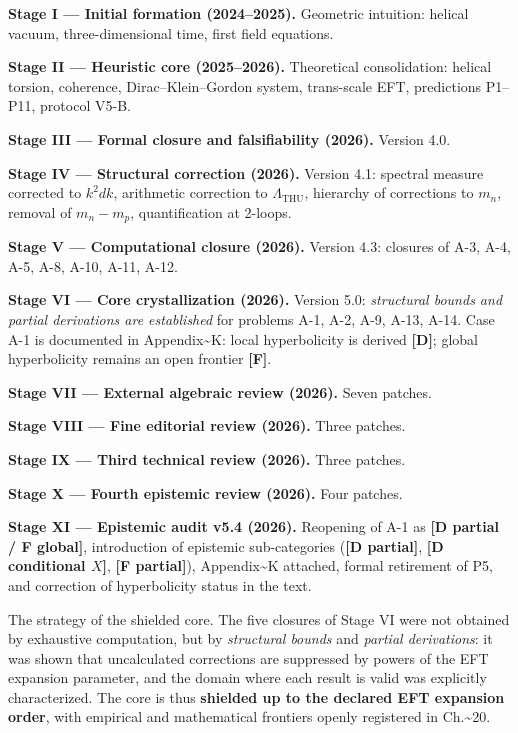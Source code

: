 ﻿\documentclass[11pt,letterpaper]{article}
\begin{document}
\textbf{Stage I --- Initial formation (2024--2025).} Geometric intuition: helical vacuum, three-dimensional time, first field equations.

\textbf{Stage II --- Heuristic core (2025--2026).} Theoretical consolidation: helical torsion, coherence, Dirac--Klein--Gordon system, trans-scale EFT, predictions P1--P11, protocol V5-B.

\textbf{Stage III --- Formal closure and falsifiability (2026).} Version 4.0.

\textbf{Stage IV --- Structural correction (2026).} Version 4.1: spectral measure corrected to $k^2 dk$, arithmetic correction to $\Lambda_{\mathrm{THU}}$, hierarchy of corrections to $m_n$, removal of $m_n - m_p$, quantification at 2-loops.

\textbf{Stage V --- Computational closure (2026).} Version 4.3: closures of A-3, A-4, A-5, A-8, A-10, A-11, A-12.

\textbf{Stage VI --- Core crystallization (2026).} Version 5.0: \emph{structural bounds and partial derivations are established} for problems A-1, A-2, A-9, A-13, A-14. Case A-1 is documented in Appendix\textasciitilde{}K: local hyperbolicity is derived \textbf{[D]}; global hyperbolicity remains an open frontier \textbf{[F]}.

\textbf{Stage VII --- External algebraic review (2026).} Seven patches.

\textbf{Stage VIII --- Fine editorial review (2026).} Three patches.

\textbf{Stage IX --- Third technical review (2026).} Three patches.

\textbf{Stage X --- Fourth epistemic review (2026).} Four patches.

\textbf{Stage XI --- Epistemic audit v5.4 (2026).} Reopening of A-1 as \textbf{[D partial / F global]}, introduction of epistemic sub-categories (\textbf{[D partial]}, \textbf{[D conditional $X$]}, \textbf{[F partial]}), Appendix\textasciitilde{}K attached, formal retirement of P5, and correction of hyperbolicity status in the text.

The strategy of the shielded core. The five closures of Stage VI were not obtained by exhaustive computation, but by \emph{structural bounds} and \emph{partial derivations}: it was shown that uncalculated corrections are suppressed by powers of the EFT expansion parameter, and the domain where each result is valid was explicitly characterized. The core is thus \textbf{shielded up to the declared EFT expansion order}, with empirical and mathematical frontiers openly registered in Ch.\textasciitilde{}20.
\end{document}
